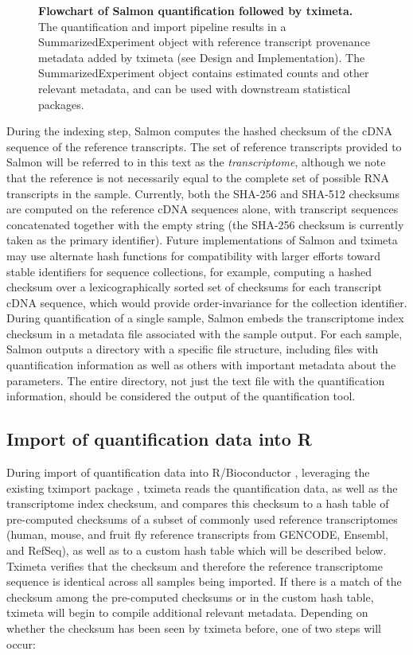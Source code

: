 \documentclass[10pt,letterpaper]{article}
\begin{document}
\begin{figure}[!h]
  \centering
  \caption{
    {\bf Flowchart of Salmon quantification followed by tximeta.}
    The quantification and import pipeline results in a
    SummarizedExperiment object with reference transcript provenance
    metadata added by tximeta (see Design and Implementation).
    The SummarizedExperiment object contains estimated counts and
    other relevant metadata, and can be used with downstream
    statistical packages.}
  \label{fig:diagram}
\end{figure}

During the indexing step, Salmon computes the hashed checksum of the
cDNA sequence of the reference transcripts. The set of reference
transcripts provided to Salmon will be referred to in this text as the
\textit{transcriptome}, although we note that the reference is not
necessarily equal to the complete set of possible RNA transcripts in
the sample. Currently, both the SHA-256 and SHA-512 \cite{sha1}
checksums are computed on the reference cDNA sequences alone, with
transcript sequences concatenated together with the empty string (the
SHA-256 checksum is currently taken as the primary identifier). Future
implementations of Salmon and tximeta may use alternate hash functions
for compatibility with larger efforts toward stable identifiers for
sequence collections, for example, computing a hashed checksum over a
lexicographically sorted set of checksums for each transcript cDNA
sequence, which would provide order-invariance for the collection
identifier. During quantification of a single sample, Salmon embeds
the transcriptome index checksum in a metadata file associated with
the sample output. For each sample, Salmon outputs a directory with a
specific file structure, including files with quantification
information as well as others with important metadata about the
parameters. The entire directory, not just the text file with the
quantification information, should be considered the output of
the quantification tool.

\subsection*{Import of quantification data into R}

During import of quantification data into R/Bioconductor
\cite{bioc}, leveraging the existing tximport package
\cite{tximport}, tximeta reads the quantification data, as well as
the transcriptome index checksum, and compares this checksum to a hash
table of pre-computed checksums of a subset of commonly used reference
transcriptomes (human, mouse, and fruit fly reference transcripts from
GENCODE, Ensembl, and RefSeq), as well as to a
custom hash table which will be described below. Tximeta verifies that
the checksum and therefore the reference transcriptome sequence is
identical across all samples being imported. If there is a match of
the checksum among the pre-computed checksums or in the custom hash table,
tximeta will begin to compile additional relevant
metadata. Depending on whether the checksum has been seen by tximeta
before, one of two steps will occur:
\end{document}
